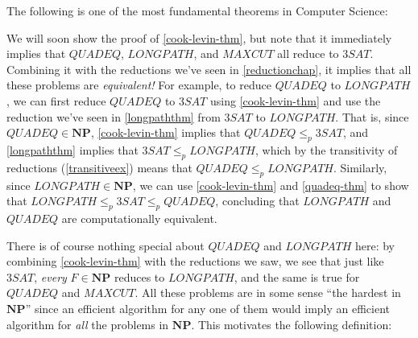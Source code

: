 The following is one of the most fundamental theorems in Computer
Science:

\hypertarget{cook-levin-thm}{}

We will soon show the proof of \cref{cook-levin-thm}, but note that it
immediately implies that \(\ensuremath{\mathit{QUADEQ}}\),
\(\ensuremath{\mathit{LONGPATH}}\), and \(\ensuremath{\mathit{MAXCUT}}\)
all reduce to \(3\ensuremath{\mathit{SAT}}\). Combining it with the
reductions we've seen in \cref{reductionchap}, it implies that all these
problems are \emph{equivalent!} For example, to reduce
\(\ensuremath{\mathit{QUADEQ}}\) to \(\ensuremath{\mathit{LONGPATH}}\),
we can first reduce \(\ensuremath{\mathit{QUADEQ}}\) to
\(3\ensuremath{\mathit{SAT}}\) using \cref{cook-levin-thm} and use the
reduction we've seen in \cref{longpaththm} from
\(3\ensuremath{\mathit{SAT}}\) to \(\ensuremath{\mathit{LONGPATH}}\).
That is, since \(\ensuremath{\mathit{QUADEQ}} \in \mathbf{NP}\),
\cref{cook-levin-thm} implies that
\(\ensuremath{\mathit{QUADEQ}} \leq_p 3\ensuremath{\mathit{SAT}}\), and
\cref{longpaththm} implies that
\(3\ensuremath{\mathit{SAT}} \leq_p \ensuremath{\mathit{LONGPATH}}\),
which by the transitivity of reductions (\cref{transitiveex}) means that
\(\ensuremath{\mathit{QUADEQ}} \leq_p \ensuremath{\mathit{LONGPATH}}\).
Similarly, since \(\ensuremath{\mathit{LONGPATH}} \in \mathbf{NP}\), we
can use \cref{cook-levin-thm} and \cref{quadeq-thm} to show that
\(\ensuremath{\mathit{LONGPATH}} \leq_p 3\ensuremath{\mathit{SAT}} \leq_p \ensuremath{\mathit{QUADEQ}}\),
concluding that \(\ensuremath{\mathit{LONGPATH}}\) and
\(\ensuremath{\mathit{QUADEQ}}\) are computationally equivalent.

There is of course nothing special about
\(\ensuremath{\mathit{QUADEQ}}\) and \(\ensuremath{\mathit{LONGPATH}}\)
here: by combining \eqref{cook-levin-thm} with the reductions we saw, we
see that just like \(3\ensuremath{\mathit{SAT}}\), \emph{every}
\(F\in \mathbf{NP}\) reduces to \(\ensuremath{\mathit{LONGPATH}}\), and
the same is true for \(\ensuremath{\mathit{QUADEQ}}\) and
\(\ensuremath{\mathit{MAXCUT}}\). All these problems are in some sense
``the hardest in \(\mathbf{NP}\)'' since an efficient algorithm for any
one of them would imply an efficient algorithm for \emph{all} the
problems in \(\mathbf{NP}\). This motivates the following definition:

